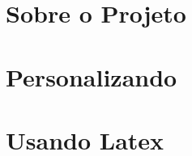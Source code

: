 \documentclass[
    12pt,openright,twoside,a4paper, %
    sumario=tradicional
    brazil, %
]{abntex2}
\begin{document}

    \frenchspacing




    \textual

    \part{Sobre o Projeto}


    \part{Personalizando}


    \part{Usando Latex}





    \postextual

    
\end{document}
